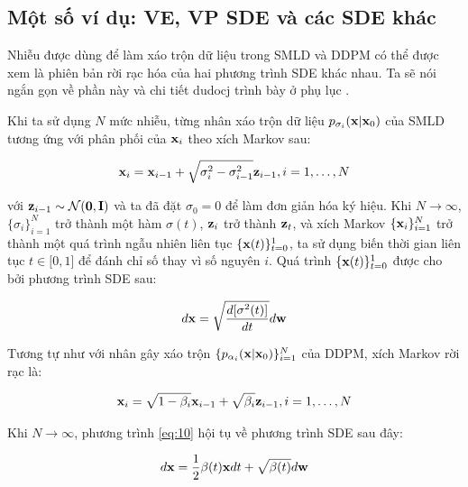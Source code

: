 \documentclass{article} %
\begin{document}
\subsection{Một số ví dụ: VE, VP SDE và các SDE khác}

Nhiễu được dùng để làm xáo trộn dữ liệu trong SMLD và DDPM có thể được xem là phiên bản rời rạc hóa của hai phương trình SDE khác nhau.
Ta sẽ nói ngắn gọn về phần này và chi tiết dudocj trình bày ở phụ lục .

Khi ta sử dụng $N$ mức nhiễu, từng nhân xáo trộn dữ liệu $p_{\sigma_i}(\bold{x} \vert \bold{x}_0)$ của SMLD tương ứng với phân phối của $\bold{x}_i$ theo xích Markov sau:

\begin{equation}
    \bold{x}_i = \bold{x}_{i-1} + \sqrt{\sigma_i^2 - \sigma_{i-1}^2} \bold{z}_{i-1}, i=1, \dots, N
\end{equation}

với $\bold{z}_{i-1} \sim \mathcal{N}(\bold{0}, \bold{I})$ và ta đã đặt $\sigma_0=0$ để làm đơn giản hóa ký hiệu.
Khi $N \rightarrow \infty$, $\lbrace \sigma_i \rbrace_{i=1}^N$ trở thành một hàm $\sigma(t)$, $\bold{z}_i$ trở thành $\bold{z}_t$, và xích Markov $\lbrace \bold{x}_i \rbrace_{i=1}^N$ trở thành một quá trình ngẫu nhiên liên tục $\lbrace \bold{x}(t) \rbrace_{t=0}^1$, ta sử dụng biến thời gian liên tục $t \in \lbrack 0, 1 \rbrack$ để đánh chỉ số thay vì số nguyên $i$.
Quá trình $\lbrace \bold{x}(t) \rbrace_{t=0}^1$ được cho bởi phương trình SDE sau:

\begin{equation} \label{eq:9}
    d \bold{x} = \sqrt{\dfrac{d \lbrack \sigma^2(t) \rbrack}{dt}} d \bold{w}
\end{equation}

Tương tự như với nhân gây xáo trộn $\lbrace p_{\alpha_i} (\bold{x} \vert \bold{x}_0) \rbrace_{i=1}^N$ của DDPM, xích Markov rời rạc là:

\begin{equation} \label{eq:10}
    \bold{x}_i = \sqrt{1 - \beta_i} \bold{x}_{i-1} + \sqrt{\beta_i} \bold{z}_{i-1}, i=1,\dots,N
\end{equation}

Khi $N \rightarrow \infty$, phương trình \ref{eq:10} hội tụ về phương trình SDE sau đây:

\begin{equation} \label{eq:11}
    d \bold{x} = \dfrac{1}{2} \beta(t) \bold{x} dt + \sqrt{\beta(t)} d\bold{w}
\end{equation}

\newpage


\end{document}
